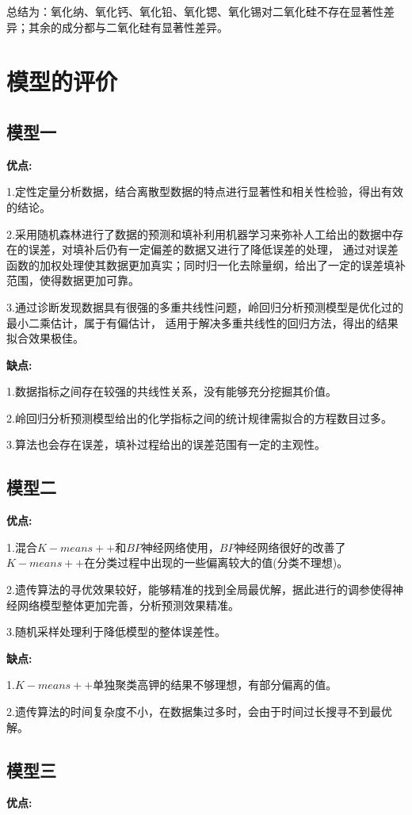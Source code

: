 \documentclass[UTF8]{ctexart}
\begin{document}
总结为：氧化纳、氧化钙、氧化铅、氧化锶、氧化锡对二氧化硅不存在显著性差异；其余的成分都与二氧化硅有显著性差异。
\section{模型的评价}
\subsection{模型一}
\noindent \textbf{优点:}

1.定性定量分析数据，结合离散型数据的特点进行显著性和相关性检验，得出有效的结论。

2.采用随机森林进行了数据的预测和填补利用机器学习来弥补人工给出的数据中存在的误差，对填补后仍有一定偏差的数据又进行了降低误差的处理，
通过对误差函数的加权处理使其数据更加真实；同时归一化去除量纲，给出了一定的误差填补范围，使得数据更加可靠。

3.通过诊断发现数据具有很强的多重共线性问题，岭回归分析预测模型是优化过的最小二乘估计，属于有偏估计，
适用于解决多重共线性的回归方法，得出的结果拟合效果极佳。


\noindent \textbf{缺点:}

1.数据指标之间存在较强的共线性关系，没有能够充分挖掘其价值。

2.岭回归分析预测模型给出的化学指标之间的统计规律需拟合的方程数目过多。

3.算法也会存在误差，填补过程给出的误差范围有一定的主观性。

\subsection{模型二}

\noindent \textbf{优点:}

1.混合$K-means++$和$BP$神经网络使用，$BP$神经网络很好的改善了$K-means++$在分类过程中出现的一些偏离较大的值(分类不理想)。

2.遗传算法的寻优效果较好，能够精准的找到全局最优解，据此进行的调参使得神经网络模型整体更加完善，分析预测效果精准。

3.随机采样处理利于降低模型的整体误差性。


\noindent \textbf{缺点:}

1.$K-means++$单独聚类高钾的结果不够理想，有部分偏离的值。

2.遗传算法的时间复杂度不小，在数据集过多时，会由于时间过长搜寻不到最优解。


\subsection{模型三}
\textbf{优点:}
\end{document}
